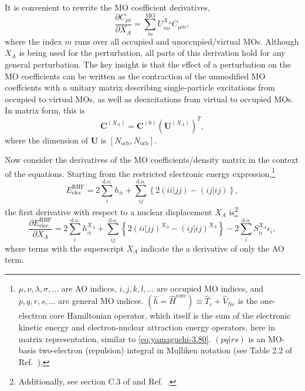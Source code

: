 \documentclass[%
class = book,%
crop = false,%
float = true,%
multi = true,%
preview = false,%
]{standalone}
\begin{document}
It is convenient to rewrite the MO coefficient derivatives,
\begin{equation}
  \tag{Yamaguchi eq. 3.7}
  \frac{\partial C_{\mu i}}{\partial X_{A}} = \sum_{m}^{\text{MO}} U_{mi}^{X_{A}} C_{\mu m},
\end{equation}
where the index \(m\) runs over all occupied and unoccupied/virtual MOs. Although \(X_{A}\) is being used for the perturbation, all parts of this derivation hold for any general perturbation. The key insight is that the effect of a perturbation on the MO coefficients can be written as the contraction of the unmodified MO coeffcients with a unitary matrix describing single-particle excitations from occupied to virtual MOs, as well as deexcitations from virtual to occupied MOs. In matrix form, this is
\begin{equation}
  \mathbf{C}^{(X_{A})} = \mathbf{C}^{(0)} \left( \mathbf{U}^{(X_{A})} \right)^{T},
\end{equation}
where the dimension of \(\mathbf{U}\) is \([N_{\text{orb}}, N_{\text{orb}}]\).

Now consider the derivatives of the MO coefficients/density matrix in the context of the \hf{} equations. Starting from the restricted \hf{} electronic energy expression,\footnote{\label{foot:hf-basics}\(\mu,\nu,\lambda,\sigma,\dots\) are AO indices, \(i,j,k,l,\dots\) are occupied MO indices, and \(p,q,r,s,\dots\) are general MO indices. \(\left(\hat{h} = \hat{H}^{\text{core}} \right) \equiv \hat{T}_{e} + \hat{V}_{Ne}\) is the one-electron core Hamiltonian operator, which itself is the sum of the electronic kinetic energy and electron-nuclear attraction energy operators, here in matrix representation, similar to \eqref{eq:yamaguchi-3.80}. \((pq|rs)\) is an MO-basis two-electron (repulsion) integral in Mulliken notation (see Table 2.2 of Ref.~\parencite{szabo1989modern}).}
\begin{equation}
  \label{eq:yamaguchi-4.1}\tag{Yamaguchi eq. 4.1}
  E_{\text{elec}}^{\text{RHF}} = 2 \sum_{i}^{\text{d.o.}} h_{ii} + \sum_{ij}^{\text{d.o.}} \left\{ 2(ii|jj) - (ij|ij) \right\},
\end{equation}
the first derivative with respect to a nuclear displacement \(X_{A}\) is\footnote{Additionally, see section C.3 of \szabo{}\cite{szabo1989modern} and Ref.~\parencite{Pople1979}.}
\begin{equation}
  \label{eq:yamaguchi-4.21}\tag{Yamaguchi eq. 4.21}
  \frac{\partial E_{\text{elec}}^{\text{RHF}}}{\partial X_{A}} = 2 \sum_{i}^{\text{d.o.}} h_{ii}^{X_{A}} + \sum_{ij}^{\text{d.o.}} \left\{ 2(ii|jj)^{X_{A}} - (ij|ij)^{X_{A}} \right\} - 2 \sum_{i}^{\text{d.o.}} S_{ii}^{X_{A}} \epsilon_{i},
\end{equation}
where terms with the superscript \(X_{A}\) indicate the a derivative of only the AO term.
\end{document}
